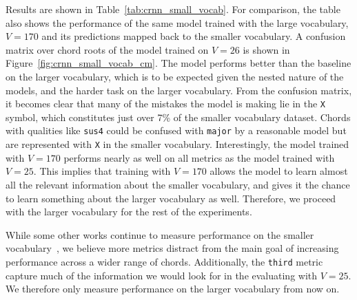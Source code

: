 

Results are shown in Table~\ref{tab:crnn_small_vocab}. For comparison, the table also shows the performance of the same model trained with the large vocabulary, $V=170$ and its predictions mapped back to the smaller vocabulary. A confusion matrix over chord roots of the model trained on $V=26$ is shown in Figure~\ref{fig:crnn_small_vocab_cm}. The model performs better than the baseline on the larger vocabulary, which is to be expected given the nested nature of the models, and the harder task on the larger vocabulary. From the confusion matrix, it becomes clear that many of the mistakes the model is making lie in the \texttt{X} symbol, which constitutes just over 7\% of the smaller vocabulary dataset. Chords with qualities like \texttt{sus4} could be confused with \texttt{major} by a reasonable model but are represented with \texttt{X} in the smaller vocabulary. Interestingly, the model trained with $V=170$ performs nearly as well on all metrics as the model trained with $V=25$. This implies that training with $V=170$ allows the model to learn almost all the relevant information about the smaller vocabulary, and gives it the chance to learn something about the larger vocabulary as well. Therefore, we proceed with the larger vocabulary for the rest of the experiments.

While some other works continue to measure performance on the smaller vocabulary~\citep{BTC}, we believe more metrics distract from the main goal of increasing performance across a wider range of chords. Additionally, the \texttt{third} metric capture much of the information we would look for in the evaluating with $V=25$. We therefore only measure performance on the larger vocabulary from now on.

